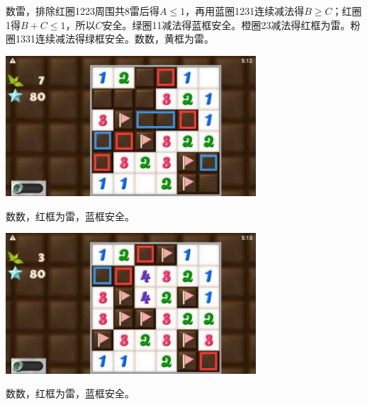 数雷，排除红圈1223周围共8雷后得$A\le 1$，再用蓝圈1231连续减法得$B\ge C$；红圈1得$B+C\le 1$，所以$C$安全。绿圈11减法得蓝框安全。橙圈23减法得红框为雷。粉圈1331连续减法得绿框安全。数数，黄框为雷。
\begin{center}
    \includegraphics[width=0.7\textwidth]{puzzlelow/246-4.jpg}
\end{center}
数数，红框为雷，蓝框安全。
\begin{center}
    \includegraphics[width=0.7\textwidth]{puzzlelow/246-5.jpg}
\end{center}
数数，红框为雷，蓝框安全。

